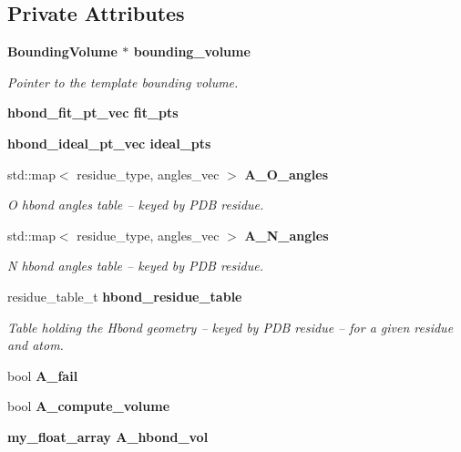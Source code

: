 \subsection*{Private Attributes}
\begin{CompactItemize}
\item 
\bf{Bounding\-Volume} $\ast$ \bf{bounding\_\-volume}\label{classASCbase_1_1HbondPoints_b8bd71a270952792930378c3ff38468b}

\begin{CompactList}\small\item\em Pointer to the template bounding volume. \item\end{CompactList}\item 
\bf{hbond\_\-fit\_\-pt\_\-vec} \textbf{fit\_\-pts}\label{classASCbase_1_1HbondPoints_d57a41a394ef6493da286ca08693e4e7}

\item 
\bf{hbond\_\-ideal\_\-pt\_\-vec} \textbf{ideal\_\-pts}\label{classASCbase_1_1HbondPoints_35657ed1abbe90e1ba27730d228c184d}

\item 
std::map$<$ residue\_\-type, angles\_\-vec $>$ \bf{A\_\-O\_\-angles}\label{classASCbase_1_1HbondPoints_c8dbf8d8fe8853dd5e8b507cd67a4c7e}

\begin{CompactList}\small\item\em O hbond angles table -- keyed by PDB residue. \item\end{CompactList}\item 
std::map$<$ residue\_\-type, angles\_\-vec $>$ \bf{A\_\-N\_\-angles}\label{classASCbase_1_1HbondPoints_324506b3ad239e15f1f82c4b7219ca6a}

\begin{CompactList}\small\item\em N hbond angles table -- keyed by PDB residue. \item\end{CompactList}\item 
residue\_\-table\_\-t \bf{hbond\_\-residue\_\-table}\label{classASCbase_1_1HbondPoints_45a1db04f743d2c692fc6c84be45765f}

\begin{CompactList}\small\item\em Table holding the Hbond geometry -- keyed by PDB residue -- for a given residue and atom. \item\end{CompactList}\item 
bool \textbf{A\_\-fail}\label{classASCbase_1_1HbondPoints_4cae614e34c14cde3be1c4c794944c87}

\item 
bool \textbf{A\_\-compute\_\-volume}\label{classASCbase_1_1HbondPoints_1314acbf5e42587a66484b4c37e766e2}

\item 
\bf{my\_\-float\_\-array} \textbf{A\_\-hbond\_\-vol}\label{classASCbase_1_1HbondPoints_806e96a34dca894dadb4b5b97fbb4117}

\end{CompactItemize}
